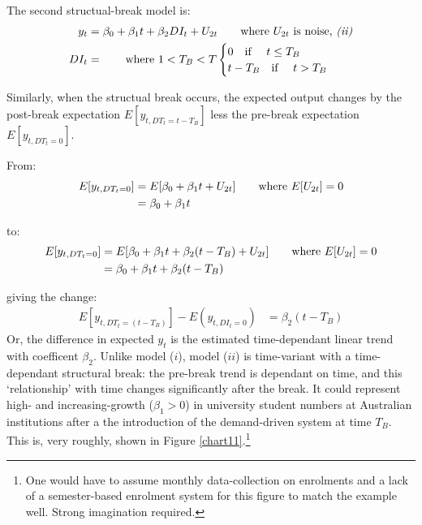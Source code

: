 \documentclass{article}
\begin{document}
    \vspace{5mm}

    The second structual-break model is:
        \begin{align*} 
        y_t  &= \beta_{0} + \beta_{1} t + \beta_{2} DI_{t} + U_{2t}    \tag*{where $U_{2t}$ is noise, \textit{(ii)}} \\ 
        DI_t &=                                      \tag*{where $1< T_B <T$}
        \begin{cases}
          0 \text{\quad  if \quad}         t \leq T_B \\
          t - T_{B} \text{\quad  if \quad} t >    T_B
        \end{cases}
      \end{align*}

    Similarly, when the structual break occurs, the expected output changes by the post-break expectation $E[y_{t,DT_{t}=t-T_B}]$ less the pre-break expectation $E[y_{t,DT_{t}=0}]$.

    From:
        \begin{align*}
          E[y_{t,DT_{t}=0}] &= E[\beta_0 +   \beta_1 t + U_{2t}]    \tag*{where $E[U_{2t}]=0$} \\ 
                            &= \beta_0 + \beta_1 t
        \end{align*}

    to:
        \begin{align*}
          E[y_{t,DT_{t}=0}] &= E[\beta_0 + \beta_1 t + \beta_2 (t - T_{B}) + U_{2t}]    \tag*{where $E[U_{2t}]=0$} \\ 
                            &= \beta_0 + \beta_1 t + \beta_2 (t - T_{B}) \\ 
        \end{align*}

    giving the change:
        \begin{align*}
          E[y_{t,DT_{t}=(t-T_{B})}] - E(y_{t,DI_{t}=0}) &= \beta_2 (t - T_{B})
        \end{align*}
    Or, the difference in expected $y_t$ is the estimated time-dependant linear trend with coefficent $\beta_2$. Unlike model ($i$), model ($ii$) is time-variant with a time-dependant structural break: the pre-break trend is dependant on time, and this `relationship' with time changes significantly after the break. It could represent high- and increasing-growth ($\beta_{1}>0$) in university student numbers at Australian institutions after a the introduction of the demand-driven system at time $T_B$. This is, very roughly, shown in Figure \ref{chart11}.\footnote{One would have to assume monthly data-collection on enrolments and a lack of a semester-based enrolment system for this figure to match the example well. Strong imagination required.}
\end{document}
